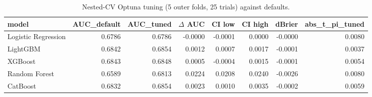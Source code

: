 \begin{table}[t]
\centering
\caption{Nested-CV Optuna tuning (5 outer folds, 25 trials) against defaults.}
\label{tab:T12d_tuning}
\small
\begin{tabular}{lrrrrrrr}
\toprule
model & AUC\_default & AUC\_tuned & $\Delta$ AUC & CI low & CI high & dBrier & abs\_t\_pi\_tuned \\
\midrule
Logistic Regression & 0.6786 & 0.6786 & -0.0000 & -0.0001 & 0.0000 & -0.0000 & 0.0080 \\
LightGBM & 0.6842 & 0.6854 & 0.0012 & 0.0007 & 0.0017 & -0.0001 & 0.0037 \\
XGBoost & 0.6843 & 0.6848 & 0.0005 & -0.0004 & 0.0015 & -0.0001 & 0.0054 \\
Random Forest & 0.6589 & 0.6813 & 0.0224 & 0.0208 & 0.0240 & -0.0026 & 0.0080 \\
CatBoost & 0.6832 & 0.6854 & 0.0023 & 0.0010 & 0.0035 & -0.0002 & 0.0059 \\
\bottomrule
\end{tabular}
\end{table}
